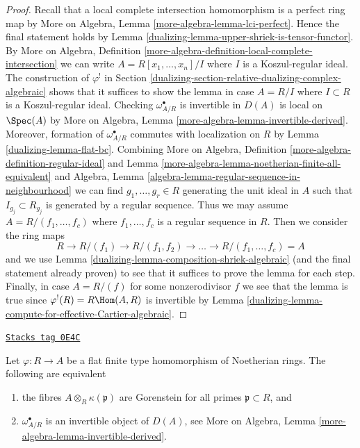 \begin{proof}

Recall that a local complete intersection homomorphism is a perfect
ring map by More on Algebra, Lemma \ref{more-algebra-lemma-lci-perfect}.
Hence the final statement holds by
Lemma \ref{dualizing-lemma-upper-shriek-is-tensor-functor}.
By More on Algebra, Definition
\ref{more-algebra-definition-local-complete-intersection}
we can write $A = R[x_1, \ldots, x_n]/I$ where $I$ is a
Koszul-regular ideal.
The construction of $\varphi^!$ in
Section \ref{dualizing-section-relative-dualizing-complex-algebraic}
shows that it suffices to show the lemma in case
$A = R/I$ where $I \subset R$ is a Koszul-regular ideal.
Checking $\omega_{A/R}^\bullet$ is invertible in $D(A)$
is local on $\Spec(A)$ by More on Algebra, Lemma
\ref{more-algebra-lemma-invertible-derived}.
Moreover, formation of $\omega_{A/R}^\bullet$ commutes with
localization on $R$ by Lemma \ref{dualizing-lemma-flat-bc}.
Combining
More on Algebra, Definition \ref{more-algebra-definition-regular-ideal} and
Lemma \ref{more-algebra-lemma-noetherian-finite-all-equivalent} and
Algebra, Lemma \ref{algebra-lemma-regular-sequence-in-neighbourhood}
we can find $g_1, \ldots, g_r \in R$ generating the unit ideal in $A$
such that $I_{g_j} \subset R_{g_j}$ is generated by a regular sequence.
Thus we may assume $A = R/(f_1, \ldots, f_c)$ where $f_1, \ldots, f_c$
is a regular sequence in $R$. Then we consider the ring maps
$$
R \to R/(f_1) \to R/(f_1, f_2) \to \ldots \to R/(f_1, \ldots, f_c) = A
$$
and we use Lemma \ref{dualizing-lemma-composition-shriek-algebraic}
(and the final statement already proven)
to see that it suffices to prove the lemma for each step.
Finally, in case $A = R/(f)$ for some nonzerodivisor $f$
we see that the lemma is true since $\varphi^!(R) = R\Hom(A, R)$
is invertible by Lemma \ref{dualizing-lemma-compute-for-effective-Cartier-algebraic}.
\end{proof}

\begin{lemma}
\label{dualizing-lemma-gorenstein-shriek}
\href{https://stacks.math.columbia.edu/tag/0E4C}{\texttt{Stacks tag 0E4C}}

Let $\varphi : R \to A$ be a flat finite type homomorphism of Noetherian rings.
The following are equivalent
\begin{enumerate}
\item the fibres $A \otimes_R \kappa(\mathfrak p)$ are Gorenstein
for all primes $\mathfrak p \subset R$, and
\item $\omega_{A/R}^\bullet$ is an invertible object of $D(A)$, see
More on Algebra, Lemma \ref{more-algebra-lemma-invertible-derived}.
\end{enumerate}
\end{lemma}

